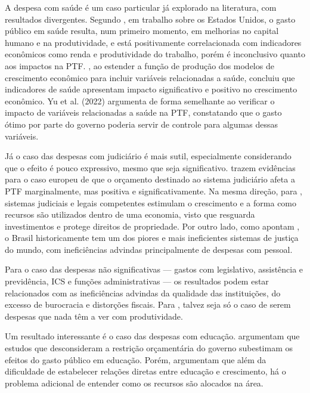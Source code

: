 \documentclass[
  12pt,
  a4paper,
  oneside,
  brazil,
  chapter=TITLE,
  section=TITLE
]{abntex2}
\begin{document}
A despesa com saúde é um caso particular já explorado na literatura, com resultados divergentes. Segundo , em trabalho sobre os Estados Unidos, o gasto público em saúde resulta, num primeiro momento, em melhorias no capital humano e na produtividade, e está positivamente correlacionada com indicadores econômicos como renda e produtividade do trabalho, porém é inconclusivo quanto aos impactos na PTF. , ao estender a função de produção dos modelos de crescimento econômico para incluir variáveis relacionadas a saúde, concluiu que indicadores de saúde apresentam impacto significativo e positivo no crescimento econômico. Yu et al. (2022) argumenta de forma semelhante ao verificar o impacto de variáveis relacionadas a saúde na PTF, constatando que o gasto ótimo por parte do governo poderia servir de controle para algumas dessas variáveis.

Já o caso das despesas com judiciário é mais sutil, especialmente considerando que o efeito é pouco expressivo, mesmo que seja significativo.  trazem evidências para o caso europeu de que o orçamento destinado ao sistema judiciário afeta a PTF marginalmente, mas positiva e significativamente. Na mesma direção, para , sistemas judiciais e legais competentes estimulam o crescimento e a forma como recursos são utilizados dentro de uma economia, visto que resguarda investimentos e protege direitos de propriedade. Por outro lado, como apontam , o Brasil historicamente tem um dos piores e mais ineficientes sistemas de justiça do mundo, com ineficiências advindas principalmente de despesas com pessoal.

Para o caso das despesas não significativas --- gastos com legislativo, assistência e previdência, ICS e funções administrativas --- os resultados podem estar relacionados com as ineficiências advindas da qualidade das instituições, do excesso de burocracia e distorções fiscais. Para , talvez seja só o caso de serem despesas que nada têm a ver com produtividade.

Um resultado interessante é o caso das despesas com educação.  argumentam que estudos que desconsideram a restrição orçamentária do governo subestimam os efeitos do gasto público em educação. Porém,  argumentam que além da dificuldade de estabelecer relações diretas entre educação e crescimento, há o problema adicional de entender como os recursos são alocados na área.
\end{document}

